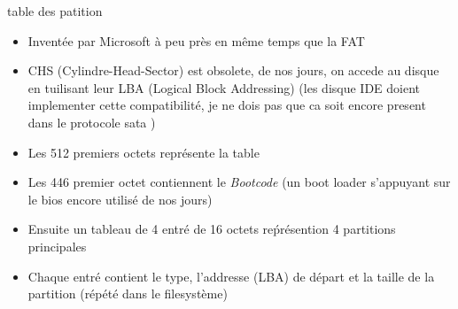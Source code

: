 \begin{frame}[fragile=singleslide]{table des patition}
  \begin{itemize}
  \item Inventée par Microsoft à peu près en même temps que la FAT
  \item  CHS (Cylindre-Head-Sector)  est  obsolete, de  nos jours,  on
    accede au disque en  tuilisant leur LBA (Logical Block Addressing)
    (les disque IDE doient implementer cette compatibilité, je ne dois
    pas que ca soit encore present dans le protocole sata )
  \item Les 512 premiers octets représente la table
  \item Les 446 premier  octet contiennent le \emph{Bootcode} (un boot
    loader s'appuyant sur le bios encore utilisé de nos jours)
  \item  Ensuite un tableau  de 4  entré de  16 octets  reṕrésention 4
    partitions principales
  \item Chaque entré  contient le type, l'addresse (LBA)  de départ et
    la taille de la partition (répété dans le filesystème)
  \end{itemize}
\end{frame}

